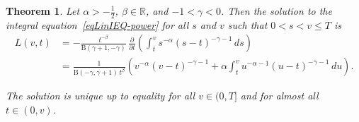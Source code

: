 \documentclass{article}
\newcommand{\vS}{v}
\theoremstyle{plain}
\newtheorem{theorem}{Theorem}
\theoremstyle{remark}
\theoremstyle{definition}
\begin{document}
\begin{theorem}\label{thm:Lker-suf}
Let $\alpha\mathbin{>}{-}\frac12$,
$\beta\mathbin{\in}\mathbb{R}$, and
${-}1\mathbin{<}\gamma\mathbin{<}0$.
Then
the solution to the integral equation~\eqref{eqLinIEQ-power}
for all $s$ and $\vS$ such that $0<s<\vS\le T$
is
\begin{align*}
L(\vS,t) &=
- \frac{t^{-\beta}}{\mathrm{B}(\gamma{+}1, {-}\gamma)} \,
\frac{\partial}{\partial t}\!
\left( \int_t^\vS s^{-\alpha} (s-t)^{-\gamma-1} \, ds \right)
\\ &=
 \frac{1}{\mathrm{B}(-\gamma, \gamma{+}1)\,t^\beta}
\left(\vS^{-\alpha} (\vS-t)^{-\gamma-1}
+ \alpha \int_t^\vS u^{-\alpha-1} (u-t)^{-\gamma-1} \,du \right).
\end{align*}

The solution is unique up to equality for all $\vS\in(0,T]$
and for almost all $t\in(0,\vS)$.
\end{theorem}
\end{document}

